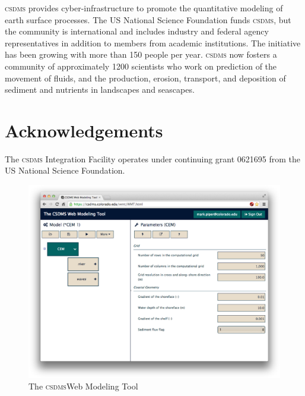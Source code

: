 \documentclass[11pt, oneside]{amsart}
\DeclareRobustCommand{\csdms}{\textsc{csdms}}
\begin{document}
\csdms{} provides cyber-infrastructure to promote the quantitative modeling of
earth surface processes. The US National Science Foundation funds \csdms{}, but
the community is international and includes industry and federal agency
representatives in addition to members from academic institutions. The
initiative has been growing with more than 150 people per year. \csdms{} now
fosters a community of approximately 1200 scientists who work on prediction
of the movement of fluids, and the production, erosion, transport, and
deposition of sediment and nutrients in landscapes and seascapes. 

\section{Acknowledgements}

The \csdms{} Integration Facility operates under continuing grant 0621695
from the US National Science Foundation.

\begin{figure}
  \caption{The \csdms Web Modeling Tool}
  \begin{center}
    \includegraphics[scale=.25]{wmt.eps}
  \end{center}
  \label{fig:wmt_screenshot}
\end{figure}



{}
\end{document}
